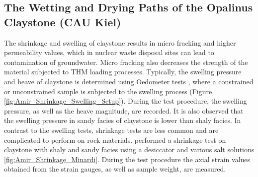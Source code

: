 \subsection{The Wetting and Drying Paths of the Opalinus Claystone (CAU Kiel)}
\label{sec:Shrinkage_Swelling_Exp}

The shrinkage and swelling of claystone results in micro fracking and higher permeability values, which in nuclear waste disposal sites can lead to contamination of groundwater. Micro fracking also decreases the strength of the material subjected to THM  loading processes. Typically, the swelling pressure and heave of claystone is determined using Oedometer tests \cite{Peronetal2009}, where a constrained or unconstrained sample is subjected to the swelling process (Figure \ref{fig:Amir_Shrinkage_Swelling_Setup}). During the test procedure, the swelling pressure, as well as the heave magnitude, are recorded. It is also observed that the swelling pressure in sandy facies of claystone is lower than shaly facies. In contrast to the swelling tests, shrinkage tests are less common and are complicated to perform on rock materials. \cite{Minardietal2016} performed a shrinkage test on claystone with shaly and sandy facies using a desiccator and various salt solutions \ref{fig:Amir_Shrinkage_Minardi}. During the test procedure the axial strain values obtained from the strain gauges, as well as sample weight, are measured.


